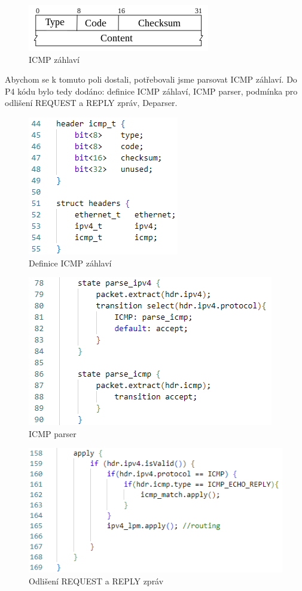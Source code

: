 \documentclass[czech, 11pt]{article}
\begin{document}
    \begin{figure}[H]
		\centering
		\includegraphics[width=.6\textwidth,height=\textheight,keepaspectratio]{Figures/icmp_header.png}
		\caption{ICMP záhlaví}
		\label{icmp_header}
	\end{figure}

    Abychom se k tomuto poli dostali, potřebovali jsme parsovat ICMP záhlaví. Do P4 kódu bylo tedy dodáno: definice ICMP záhlaví, ICMP parser, podmínka pro odlišení REQUEST a REPLY zpráv, Deparser.

    \begin{figure}[H]
		\centering
		\includegraphics[width=.3\textwidth,height=\textheight,keepaspectratio]{Figures/icmp_parsovani/header.png}
		\caption{Definice ICMP záhlaví}
		\label{icmp_header}
	\end{figure}

    \begin{figure}[H]
		\centering
		\includegraphics[width=.5\textwidth,height=\textheight,keepaspectratio]{Figures/icmp_parsovani/parser.png}
		\caption{ICMP parser}
		\label{icmp_header}
	\end{figure}

     \begin{figure}[H]
		\centering
		\includegraphics[width=.6\textwidth,height=\textheight,keepaspectratio]{Figures/icmp_parsovani/apply.png}
		\caption{Odlišení REQUEST a REPLY zpráv}
		\label{icmp_header}
	\end{figure}
\end{document}
